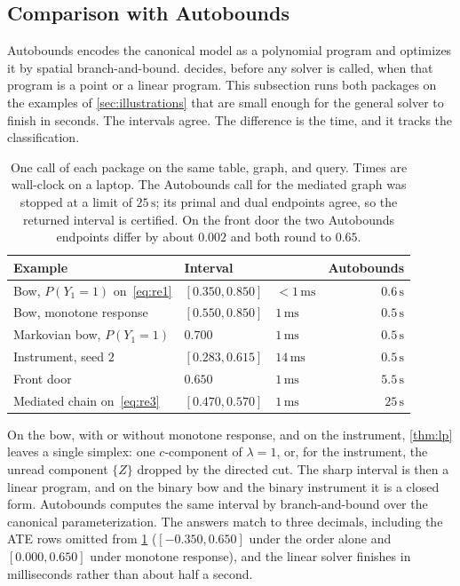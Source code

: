 \subsection{Comparison with Autobounds}
\label{app:autobounds}

Autobounds \citep{duarte2024automated} encodes the canonical model as a
polynomial program and optimizes it by spatial branch-and-bound. 
decides, before any solver is called, when that program is a
point or a linear program. This subsection runs both packages on the examples of
\cref{sec:illustrations} that are small enough for the general solver to
finish in seconds. The intervals agree. The difference is the time, and it
tracks the classification.

\begin{table}[ht]
\centering
\caption{One call of each package on the same table, graph, and query.
Times are wall-clock on a laptop. The Autobounds call for the mediated graph
was stopped at a limit of $25\,\mathrm{s}$; its primal and dual endpoints
agree, so the returned interval is certified. On the front door the two
Autobounds endpoints differ by about $0.002$ and both round to $0.65$.}
\label{tab:autobounds}
\small
\begin{tabular}{@{}lllr@{}}
\toprule
Example & Interval & \pid{} & Autobounds \\
\midrule
Bow, $P(Y_1{=}1)$ on~\eqref{eq:re1} & $[0.350,0.850]$ & $<1\,\mathrm{ms}$ & $0.6\,\mathrm{s}$ \\
Bow, monotone response & $[0.550,0.850]$ & $1\,\mathrm{ms}$ & $0.5\,\mathrm{s}$ \\
Markovian bow, $P(Y_1{=}1)$ & $0.700$ & $1\,\mathrm{ms}$ & $0.5\,\mathrm{s}$ \\
Instrument, seed $2$ & $[0.283,0.615]$ & $14\,\mathrm{ms}$ & $0.5\,\mathrm{s}$ \\
Front door & $0.650$ & $1\,\mathrm{ms}$ & $5.5\,\mathrm{s}$ \\
Mediated chain on~\eqref{eq:re3} & $[0.470,0.570]$ & $1\,\mathrm{ms}$ & $25\,\mathrm{s}$ \\
\bottomrule
\end{tabular}
\end{table}

On the bow, with or without monotone response, and on the instrument,
\cref{thm:lp} leaves a single simplex: one $c$-component of $\lambda=1$, or,
for the instrument, the unread component $\{Z\}$ dropped by the directed cut.
The sharp interval is then a linear program, and on the binary bow and the
binary instrument it is a closed form. Autobounds computes the same interval
by branch-and-bound over the canonical parameterization. The answers match to
three decimals, including the ATE rows omitted from \cref{tab:autobounds}
($[-0.350,0.650]$ under the order alone and $[0.000,0.650]$ under monotone
response), and the linear solver finishes in milliseconds rather than about
half a second.

